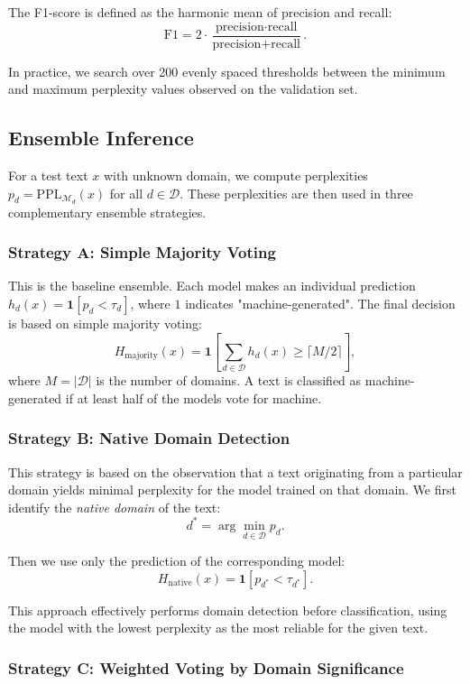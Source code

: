 \documentclass{article}
\begin{document}
The F1-score is defined as the harmonic mean of precision and recall:
\[
\text{F1} = 2 \cdot \frac{\text{precision} \cdot \text{recall}}{\text{precision} + \text{recall}}.
\]

In practice, we search over 200 evenly spaced thresholds between the minimum and maximum perplexity values observed on the validation set.

\subsection{Ensemble Inference}

For a test text $x$ with unknown domain, we compute perplexities $p_d = \text{PPL}_{\mathcal{M}_d}(x)$ for all $d \in \mathcal{D}$. These perplexities are then used in three complementary ensemble strategies.

\subsubsection{Strategy A: Simple Majority Voting}

This is the baseline ensemble. Each model makes an individual prediction $h_d(x) = \mathbf{1}[p_d < \tau_d]$, where $1$ indicates "machine-generated". The final decision is based on simple majority voting:
\[
H_{\text{majority}}(x) = \mathbf{1}\left[ \sum_{d \in \mathcal{D}} h_d(x) \geq \lceil M/2 \rceil \right],
\]
where $M = |\mathcal{D}|$ is the number of domains. A text is classified as machine-generated if at least half of the models vote for machine.

\subsubsection{Strategy B: Native Domain Detection}

This strategy is based on the observation that a text originating from a particular domain yields minimal perplexity for the model trained on that domain. We first identify the \textit{native domain} of the text:
\[
d^* = \arg\min_{d \in \mathcal{D}} p_d.
\]

Then we use only the prediction of the corresponding model:
\[
H_{\text{native}}(x) = \mathbf{1}[p_{d^*} < \tau_{d^*}].
\]

This approach effectively performs domain detection before classification, using the model with the lowest perplexity as the most reliable for the given text.

\subsubsection{Strategy C: Weighted Voting by Domain Significance}
\end{document}
